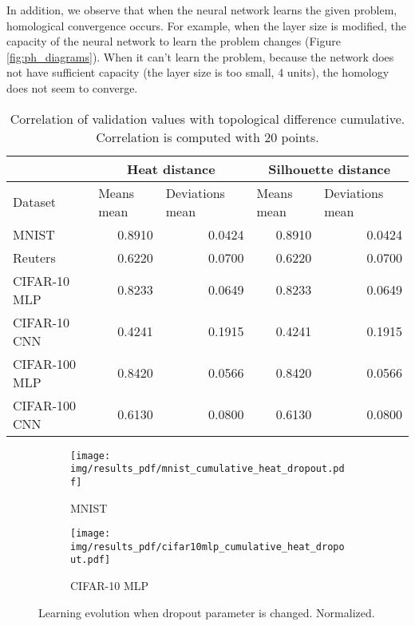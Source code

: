 \documentclass{article}
\begin{document}
In addition, we observe that when the neural network learns the given problem, homological convergence occurs. For example, when the layer size is modified, the capacity of the neural network to learn the problem changes (Figure \ref{fig:ph_diagrams}). When it can't learn the problem, because the network does not have sufficient capacity (the layer size is too small, 4 units), the homology does not seem to converge.  

\begin{table}[]
\centering
\begin{tabular}{@{}lrrrr@{}}
\cmidrule(l){2-5}
 & \multicolumn{2}{c}{Heat distance} & \multicolumn{2}{c}{Silhouette distance} \\ \midrule
Dataset & \multicolumn{1}{l}{Means mean} & \multicolumn{1}{l}{Deviations mean} & \multicolumn{1}{l}{Means mean} & \multicolumn{1}{l}{Deviations mean} \\ \midrule
MNIST & 0.8910 & 0.0424 & 0.8910 & 0.0424 \\
Reuters & 0.6220 & 0.0700 & 0.6220 & 0.0700 \\
CIFAR-10 MLP & 0.8233 & 0.0649 & 0.8233 & 0.0649 \\
CIFAR-10 CNN & 0.4241 & 0.1915 & 0.4241 & 0.1915 \\
CIFAR-100 MLP & 0.8420 & 0.0566 & 0.8420 & 0.0566 \\
CIFAR-100 CNN & 0.6130 & 0.0800 & 0.6130 & 0.0800 \\
 \bottomrule
\end{tabular}
\caption{Correlation of validation values with topological difference cumulative. Correlation is computed with 20 points.}
\label{tab:correlations}
\end{table}



\begin{figure}[h]
\centering
\begin{subfigure}{.48\textwidth}
  \centering
  \texttt{[image: img/results\_pdf/mnist\_cumulative\_heat\_dropout.pdf]}
  \caption{MNIST}
\end{subfigure}
\begin{subfigure}{.48\textwidth}
  \centering
  \texttt{[image: img/results\_pdf/cifar10mlp\_cumulative\_heat\_dropout.pdf]}
  \caption{CIFAR-10 MLP}
\end{subfigure}
\caption{Learning evolution when dropout parameter is changed. Normalized.}
\label{fig:result_dropout}
\end{figure}
\end{document}
